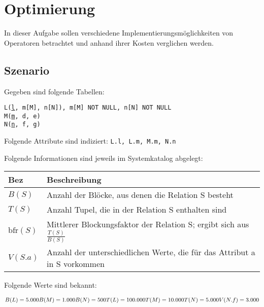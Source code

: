 \beamertxt{\pagebreak}

\section{Optimierung}

In dieser Aufgabe sollen verschiedene Implementierungsmöglichkeiten von Operatoren betrachtet und anhand ihrer Kosten verglichen werden.

\subsection*{Szenario}

Gegeben sind folgende Tabellen:

\texttt{L(\underline{l}, m[M], n[N]), m[M] NOT NULL, n[N] NOT NULL} \\
\texttt{M(\underline{m}, d, e)} \\
\texttt{N(\underline{n}, f, g)}

Folgende Attribute sind indiziert: \texttt{L.l, L.m, M.m, N.n}

Folgende Informationen sind jeweils im Systemkatalog abgelegt:

\begin{tabular}{p{2.5cm} p{10.97cm}}
	\hline
	\textbf{Bez\normaltxt[.]{eichnung}}  & \textbf{Beschreibung} \\
	\hline
	$B(S)$								& Anzahl der Blöcke, aus denen die Relation S besteht \\
	\hline
	$T(S)$								& Anzahl Tupel, die in der Relation S enthalten sind \\
	\hline
	$\mathrm{bfr}(S)$			& Mittlerer Blockungsfaktor der Relation S; ergibt sich aus $\frac{T(S)}{B(S)}$ \\
	\hline
	$V(S.a)$							& Anzahl der unterschiedlichen Werte, die für das Attribut a in S vorkommen \\
	\hline
\end{tabular}

\beamertxt{\pagebreak}

Folgende Werte sind bekannt:

$B(L) =       5.000 \\
B(M)  =       1.000 \\
B(N)  =         500 \\
T(L)  =     100.000 \\
T(M)  =      10.000 \\
T(N)  =       5.000 \\
V(N.f) =      3.000$

